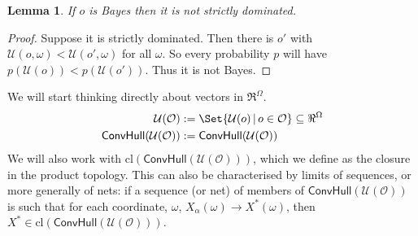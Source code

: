 \documentclass[a4paper]{article}
\newtheorem{theorem}{Theorem}
\newtheorem{definition}{Definition}
\newtheorem{lemma}[theorem]{Lemma}
\newcommand\cl{\mathrm{cl}}
\renewcommand\O{\mathcal{O}}
\newcommand\Uwald{\mathcal{U}} %
\newcommand{\Conv}{\mathsf{ConvHull}}
\newcommand\SetDelimiter[1][]{
	\nonscript\,#1\vert \allowbreak \nonscript\,\mathopen{}}
\providecommand\given{\SetDelimiter}
\renewcommand{\geq}{\geqslant}
\newenvironment{CCM rewritten}
{\begingroup\color{blue}} %
{\endgroup}              %
\begin{document}
	
	
	
	\begin{lemma}\label{thm:cct:Bayes implies admiss}
		If $o$ is Bayes then it is not strictly dominated.
	\end{lemma}
	\begin{proof}
		Suppose it is strictly dominated. Then there is $o'$ with $\Uwald(o,\omega)<\Uwald(o',\omega)$ for all $\omega$. So every probability $p$ will have $p( \Uwald(o))<p(\Uwald(o'))$. Thus it is not Bayes.
	\end{proof}
	
	
	We will start thinking directly about vectors in $\Re^\Omega$. 
	\begin{align} 
		\Uwald(\O) &:= \Set{\Uwald(o)\given o\in \O}\subseteq\Re^\Omega\\
		\Conv(\Uwald(\O))&:=\mathsf{ConvHull}(\Uwald(\O))
	\end{align}
	We will also work with $\cl(\Conv(\Uwald(\O)))$, which we define as the closure in the product topology. This can also be characterised by limits of sequences, or more generally of nets: if a sequence (or net) of members of $\Conv(\Uwald(\O))$ is such that for each coordinate, $\omega$, $X_\alpha(\omega)\longrightarrow X^*(\omega)$, then $X^*\in\cl(\Conv(\Uwald(\O)))$. 
	
	
\end{document}
